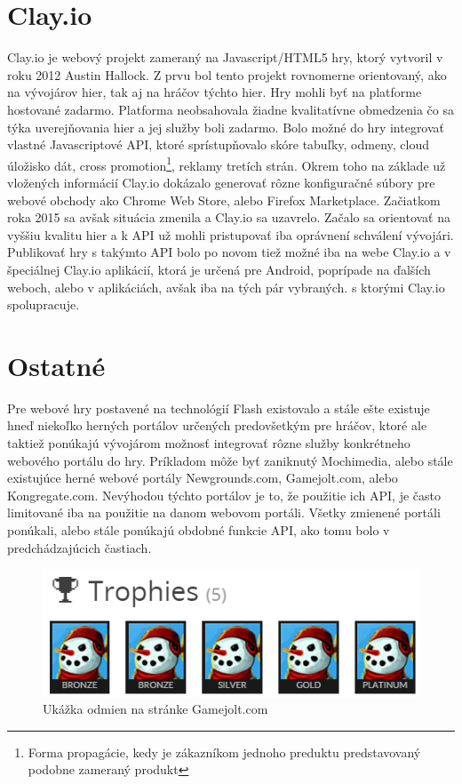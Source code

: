 \section{Clay.io}
Clay.io je webový projekt zameraný na Javascript/HTML5 hry, ktorý vytvoril v roku 2012 Austin Hallock. Z prvu bol tento projekt rovnomerne orientovaný, ako na vývojárov hier, tak aj na hráčov týchto hier. Hry mohli byť na platforme hostované zadarmo. Platforma neobsahovala žiadne kvalitatívne obmedzenia čo sa týka uverejňovania hier a jej služby boli zadarmo. Bolo možné do hry integrovať vlastné Javascriptové API, ktoré sprístupňovalo skóre tabuľky, odmeny, cloud úložisko dát, cross promotion\footnote{Forma propagácie, kedy je zákazníkom jednoho preduktu predstavovaný podobne zameraný produkt}, reklamy tretích strán. Okrem toho na základe už vložených informácií Clay.io dokázalo generovať rôzne konfiguračné súbory pre webové obchody ako Chrome Web Store, alebo Firefox Marketplace. Začiatkom roka 2015 sa avšak situácia zmenila a Clay.io sa uzavrelo. Začalo sa orientovať na vyššiu kvalitu hier a k API už mohli pristupovať iba oprávnení schválení vývojári. Publikovať hry s takýmto API bolo po novom tiež možné iba na webe Clay.io a v špeciálnej Clay.io aplikácií, ktorá je určená pre Android, poprípade na ďalších weboch, alebo v aplikáciách, avšak iba na tých pár vybraných. s ktorými Clay.io spolupracuje. \cite{clayio}  

\section{Ostatné}
Pre webové hry postavené na technológií Flash existovalo a stále ešte existuje hneď niekoľko herných portálov určených predovšetkým pre hráčov, ktoré ale taktiež ponúkajú vývojárom možnosť integrovať rôzne služby konkrétneho webového portálu do hry. Príkladom môže byť zaniknutý Mochimedia, alebo stále existujúce herné webové portály Newgrounds.com, Gamejolt.com, alebo Kongregate.com. Nevýhodou týchto portálov je to, že použitie ich API, je často limitované iba na použitie na danom webovom portáli. Všetky zmienené portáli ponúkali, alebo stále ponúkajú obdobné funkcie API, ako tomu bolo v predchádzajúcich častiach. 
\begin{figure}[h]
  \centering
  \includegraphics[scale=0.5]{fig/odmeny2.png}
  \caption{Ukážka odmien na stránke Gamejolt.com}
  \label{fig:odmeny}
\end{figure}

